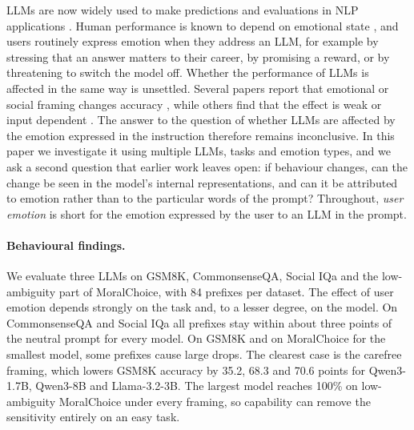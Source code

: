 \documentclass[11pt]{article}
\begin{document}
LLMs are now widely used to make predictions and evaluations in NLP applications \citep{zhao2023survey}. Human performance is known to depend on emotional state \citep{yerkes1908}, and users routinely express emotion when they address an LLM, for example by stressing that an answer matters to their career, by promising a reward, or by threatening to switch the model off. Whether the performance of LLMs is affected in the same way is unsettled. Several papers report that emotional or social framing changes accuracy \citep{li2023emotion,dobariya2025mind,kuznetsov2026freakout}, while others find that the effect is weak or input dependent \citep{zhao2026emotions}. The answer to the question of whether LLMs are affected by the emotion expressed in the instruction therefore remains inconclusive. In this paper we investigate it using multiple LLMs, tasks and emotion types, and we ask a second question that earlier work leaves open: if behaviour changes, can the change be seen in the model's internal representations, and can it be attributed to emotion rather than to the particular words of the prompt? Throughout, \emph{user emotion} is short for the emotion expressed by the user to an LLM in the prompt.

\paragraph{Behavioural findings.} We evaluate three LLMs on GSM8K, CommonsenseQA, Social IQa and the low-ambiguity part of MoralChoice, with 84 prefixes per dataset. The effect of user emotion depends strongly on the task and, to a lesser degree, on the model. On CommonsenseQA and Social IQa all prefixes stay within about three points of the neutral prompt for every model. On GSM8K and on MoralChoice for the smallest model, some prefixes cause large drops. The clearest case is the carefree framing, which lowers GSM8K accuracy by 35.2, 68.3 and 70.6 points for Qwen3-1.7B, Qwen3-8B and Llama-3.2-3B. The largest model reaches 100\% on low-ambiguity MoralChoice under every framing, so capability can remove the sensitivity entirely on an easy task.
\end{document}
